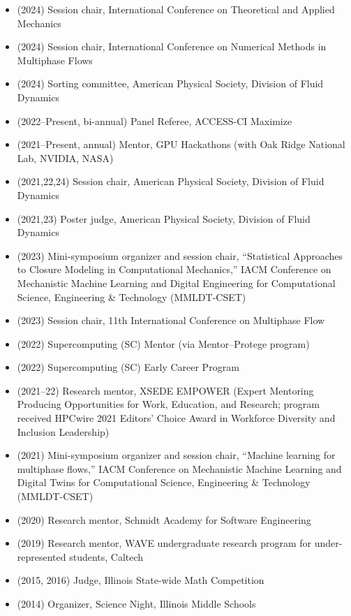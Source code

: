 \begin{itemize}
    \item (2024) Session chair, International Conference on Theoretical and Applied Mechanics
    \item (2024) Session chair, International Conference on Numerical Methods in Multiphase Flows
    \item (2024) Sorting committee, American Physical Society, Division of Fluid Dynamics
    \item (2022--Present, bi-annual) Panel Referee, ACCESS-CI Maximize
    \item (2021--Present, annual) Mentor, GPU Hackathons (with Oak Ridge National Lab, NVIDIA, NASA)
    \item (2021,22,24) Session chair, American Physical Society, Division of Fluid Dynamics
    \item (2021,23) Poster judge, American Physical Society, Division of Fluid Dynamics
    \item (2023) Mini-symposium organizer and session chair, ``Statistical Approaches to Closure Modeling in Computational Mechanics,'' IACM Conference on Mechanistic Machine Learning and Digital Engineering for Computational Science, Engineering \& Technology (MMLDT-CSET)
    \item (2023) Session chair, 11th International Conference on Multiphase Flow
    \item (2022) Supercomputing (SC) Mentor (via Mentor--Protege program)
    \item (2022) Supercomputing (SC) Early Career Program
    \item (2021--22) Research mentor, XSEDE EMPOWER (Expert Mentoring Producing Opportunities for Work, Education, and Research; program received HPCwire 2021 Editors' Choice Award in Workforce Diversity and Inclusion Leadership)
    \item (2021) Mini-symposium organizer and session chair, ``Machine learning for multiphase flows,'' IACM Conference on Mechanistic Machine Learning and Digital Twins for Computational Science, Engineering \& Technology (MMLDT-CSET)
    \item (2020) Research mentor, Schmidt Academy for Software Engineering
    \item (2019) Research mentor, WAVE undergraduate research program for under-represented students, Caltech
    \item (2015, 2016) Judge, Illinois State-wide Math Competition
    \item (2014) Organizer, Science Night, Illinois Middle Schools
\end{itemize}

